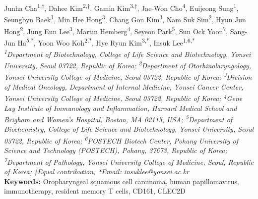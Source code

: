 \begin{center}
Junha Cha\textsuperscript{1,†}, Dahee Kim\textsuperscript{2,†}, Gamin Kim\textsuperscript{3,†}, Jae-Won Cho\textsuperscript{4}, Euijeong Sung\textsuperscript{1}, Seungbyn Baek\textsuperscript{1}, Min Hee Hong\textsuperscript{3}, Chang Gon Kim\textsuperscript{3}, Nam Suk Sim\textsuperscript{2}, Hyun Jun Hong\textsuperscript{2}, Jung Eun Lee\textsuperscript{3}, Martin Hemberg\textsuperscript{4}, Seyeon Park\textsuperscript{5}, Sun Ock Yoon\textsuperscript{7}, Sang-Jun Ha\textsuperscript{5,*}, Yoon Woo Koh\textsuperscript{2,*}, Hye Ryun Kim\textsuperscript{3,*}, Insuk Lee\textsuperscript{1,6,*} \\
\vspace{0.2cm}
\textit{\textsuperscript{1}Department of Biotechnology, College of Life Science and Biotechnology, Yonsei University, Seoul 03722, Republic of Korea; \textsuperscript{2}Department of Otorhinolaryngology, Yonsei University College of Medicine, Seoul 03722, Republic of Korea; \textsuperscript{3}Division of Medical Oncology, Department of Internal Medicine, Yonsei Cancer Center, Yonsei University College of Medicine, Seoul 03722, Republic of Korea; \textsuperscript{4}Gene Lay Institute of Immunology and Inflammation, Harvard Medical School and Brigham and Women’s Hospital, Boston, MA 02115, USA; \textsuperscript{5}Department of Biochemistry, College of Life Science and Biotechnology, Yonsei University, Seoul 03722, Republic of Korea; \textsuperscript{6}POSTECH Biotech Center, Pohang University of Science and Technology (POSTECH), Pohang, 37673, Republic of Korea; \textsuperscript{7}Department of Pathology, Yonsei University College of Medicine, Seoul, Republic of Korea; †Equal contribution; *Email: insuklee@yonsei.ac.kr} \\
\vspace{0.2cm}
\textbf{Keywords:} Oropharyngeal squamous cell carcinoma, human papillomavirus, immunotherapy, resident memory T cells, CD161, CLEC2D
\end{center}


